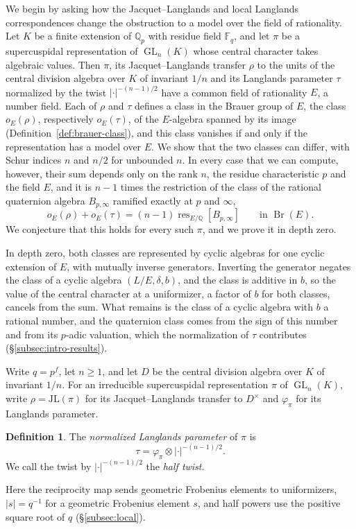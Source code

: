 \documentclass[a4paper,11pt]{amsart}
\theoremstyle{definition}
\newtheorem{definition}[theorem]{Definition}
\theoremstyle{remark}
\numberwithin{equation}{section}
\newcommand{\Q}{\mathbb{Q}}
\DeclareMathOperator{\Br}{Br}
\DeclareMathOperator{\res}{res}
\DeclareMathOperator{\GL}{GL}
\newcommand{\F}{\mathbb{F}}
\newcommand{\JL}{\mathrm{JL}}
\newcommand{\Bpinf}{B_{p,\infty}}
\begin{document}
We begin by asking how the Jacquet--Langlands and local Langlands correspondences change the obstruction to a model over the field of rationality. Let $K$ be a finite extension of $\Q_p$ with residue field $\F_q$, and let $\pi$ be a supercuspidal representation of $\GL_n(K)$ whose central character takes algebraic values. Then $\pi$, its Jacquet--Langlands transfer $\rho$ to the units of the central division algebra over $K$ of invariant $1/n$ and its Langlands parameter $\tau$ normalized by the twist $|\cdot|^{-(n-1)/2}$ have a common field of rationality $E$, a number field. Each of $\rho$ and $\tau$ defines a class in the Brauer group of $E$, the class $o_E(\rho)$, respectively $o_E(\tau)$, of the $E$-algebra spanned by its image (Definition~\ref{def:brauer-class}), and this class vanishes if and only if the representation has a model over $E$. We show that the two classes can differ, with Schur indices $n$ and $n/2$ for unbounded $n$. In every case that we can compute, however, their sum depends only on the rank $n$, the residue characteristic $p$ and the field $E$, and it is $n-1$ times the restriction of the class of the rational quaternion algebra $\Bpinf$ ramified exactly at $p$ and $\infty$,
\begin{equation}\label{eq:intro-sum}
 o_E(\rho)+o_E(\tau)=(n-1)\res_{E/\Q}[\Bpinf]\qquad\text{in }\Br(E).
\end{equation}
We conjecture that this holds for every such $\pi$, and we prove it in
depth zero.

In depth zero, both classes are represented by cyclic algebras for one cyclic extension of $E$, with mutually inverse generators. Inverting the generator negates the class of a cyclic algebra $(L/E,\delta,b)$, and the class is additive in $b$, so the value of the central character at a uniformizer, a factor of $b$ for both classes, cancels from the sum. What remains is the class of a cyclic algebra with $b$ a rational number, and the quaternion class comes from the sign of this number and from its $p$-adic valuation, which the normalization of $\tau$ contributes (\S\ref{subsec:intro-results}).

Write $q=p^f$, let $n\ge1$, and let $D$ be the central division algebra over $K$ of invariant $1/n$. For an irreducible supercuspidal representation $\pi$ of $\GL_n(K)$, write $\rho=\JL(\pi)$ for its Jacquet--Langlands transfer to $D^\times$ and $\varphi_\pi$ for its Langlands parameter.

\begin{definition}\label{def:normalized-parameter}
The \emph{normalized Langlands parameter} of $\pi$ is
\[
 \tau=\varphi_\pi\otimes|\cdot|^{-(n-1)/2}.
\]
We call the twist by $|\cdot|^{-(n-1)/2}$ the \emph{half twist}. 
\end{definition}
Here the reciprocity map sends geometric Frobenius elements to uniformizers, $|s|=q^{-1}$ for a geometric Frobenius element $s$, and half powers use the positive square root of $q$ (\S\ref{subsec:local}).
\end{document}
